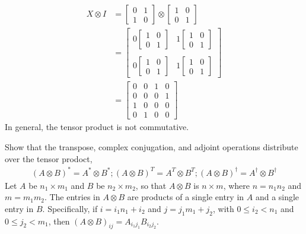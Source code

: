 \begin{align*}
	X \otimes I &= \begin{bmatrix}
		0 & 1 \\
		1 & 0
	\end{bmatrix}
	\otimes
	\begin{bmatrix}
		1 & 0 \\
		0 & 1
	\end{bmatrix}\\
	&=\begin{bmatrix}
		0\begin{bmatrix}
			1 & 0 \\
			0 & 1
		\end{bmatrix}
		&
		1\begin{bmatrix}
			1 & 0 \\
			0 & 1
		\end{bmatrix}
		\\ \\
		0\begin{bmatrix}
			1 & 0 \\
			0 & 1
		\end{bmatrix}
		&
		1\begin{bmatrix}
			1 & 0 \\
			0 & 1
		\end{bmatrix}
	\end{bmatrix} \\
	&= \begin{bmatrix}
	0 & 0 & 1 & 0 \\
	0 & 0 & 0 & 1 \\
	1 & 0 & 0 & 0 \\
	0 & 1 & 0 & 0
	\end{bmatrix}
\end{align*}
In general, the tensor product is not commutative.

 Show that the transpose, complex conjugation, and adjoint operations distribute over the tensor prodoct,
\begin{align*}(A\otimes B)^* = A^*\otimes B^*; (A\otimes B)^T = A^T\otimes B^T; (A\otimes B)^\dagger = A^\dagger \otimes B^\dagger\end{align*}
\Soln Let $A$ be $n_1\times m_1$ and $B$ be $n_2\times m_2$, so that $A\otimes B$ is $n\times m$, where $n=n_1n_2$ and $m=m_1m_2$.  The entries in $A\otimes B$ are products of a single entry in $A$ and a single entry in $B$.  Specifically, if $i = i_1n_1+i_2$ and $j = j_1m_1+j_2$, with $0\leq i_2 < n_1$ and $0\leq j_2 <  m_1$, then $(A\otimes B)_{ij}= A_{i_1j_1}B_{i_2j_2}$.


